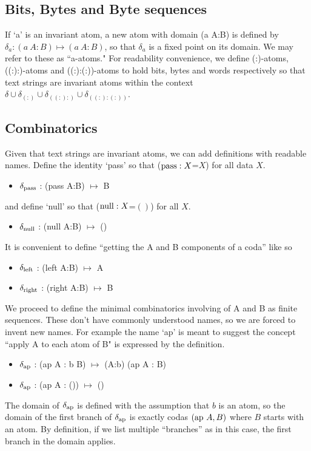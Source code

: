 \documentclass[11pt]{article}
\begin{document}
\subsection{Bits, Bytes and Byte sequences}

If `a' is an invariant atom, a new atom with domain (a A:B) is defined by $\delta_a: (a\ A:B)\mapsto (a\ A:B)$, so that $\delta_a$ is a fixed point on its domain.  
We may refer to these as ``a-atoms."  For readability convenience, we define (:)-atoms, ((:):)-atoms and ((:):(:))-atoms to hold bits, bytes and words respectively
so that text strings are invariant atoms within the context $\delta\cup\delta_{(:)}\cup\delta_{((:):)}\cup\delta_{((:):(:))}$.

\subsection{Combinatorics} 

Given that text strings are invariant atoms, we can add definitions with readable names.  Define the identity `pass' so that (${\rm pass}:X$=$X$) for all data $X$.  
\begin{itemize}
\item{$\delta_{\rm pass}$ : ({\rm pass} A:B) $\mapsto$ B}
\end{itemize}
and define `null' so that (${\rm null}:X$=$()$) for all $X$.
\begin{itemize}
\item{$\delta_{\rm null}$ : ({\rm null} A:B) $\mapsto$ ()}
\end{itemize}
It is convenient to define ``getting the A and B components of a coda'' like so
\begin{itemize}
\item{$\delta_{\rm left}$ : ({\rm left} A:B) $\mapsto$ A} 
\item{$\delta_{\rm right}$ : ({\rm right} A:B) $\mapsto$ B} 
\end{itemize}
We proceed to define the minimal combinatorics involving of A and B as finite sequences.  These don't have 
commonly understood names, so we are forced to invent new names.  For example the name `ap' is meant to suggest the 
concept ``apply A to each atom of B" is expressed by the definition.  
\begin{itemize}
\item{$\delta_{\rm ap}$ : ({\rm ap} A : b B) $\mapsto$ (A:b) ({\rm ap} A : B)}
\item{$\delta_{\rm ap}$ : ({\rm ap} A : ()) $\mapsto$ ()} 
\end{itemize} 
The domain of $\delta_{\rm ap}$ is defined with the assumption that $b$ is an atom, so the domain of the first branch of $\delta_{\rm ap}$ is exactly 
codas $({\rm ap}\ A,B)$ where $B$ starts with an atom.  By definition, if we list multiple ``branches'' as in this case, the first branch in the domain applies.  
\end{document}
